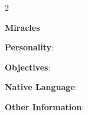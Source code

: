 \documentclass[10pt]{article}
\begin{document}
\begin{multicols}{2}
\hrulefill


\hrulefill


\hrulefill


\hrulefill


\hrulefill


\hrulefill



\columnbreak

\vspace*{24pt}

\textbf{Miracles }




\hrulefill


\hrulefill


\hrulefill


\hrulefill


\hrulefill


\hrulefill


\hrulefill


\hrulefill


\hrulefill


\hrulefill


\hrulefill


\hrulefill


\hrulefill


\hrulefill


\hrulefill


\vspace{24pt}

\textbf{Personality}: \hrulefill

\hrulefill

\hrulefill

\hrulefill

\textbf{Objectives}: \hrulefill

\hrulefill

\hrulefill


\textbf{Native Language}: \hrulefill

\hrulefill

\textbf{Other Information}: \hrulefill

\hrulefill

\hrulefill

\hrulefill

\hrulefill

\hrulefill

\end{multicols}
\end{document}
